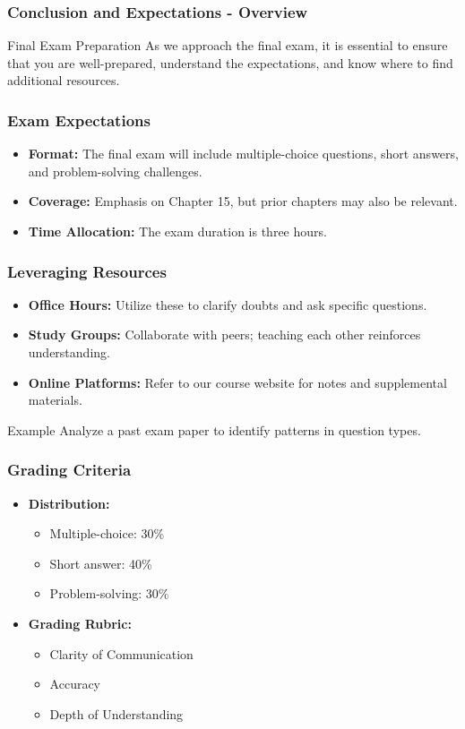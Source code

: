 \documentclass[aspectratio=169]{beamer}
\begin{document}
\begin{frame}[fragile]
    \frametitle{Conclusion and Expectations - Overview}
    \begin{block}{Final Exam Preparation}
        As we approach the final exam, it is essential to ensure that you are well-prepared, understand the expectations, and know where to find additional resources.
    \end{block}
\end{frame}

\begin{frame}[fragile]
    \frametitle{Exam Expectations}
    \begin{itemize}
        \item \textbf{Format:} The final exam will include multiple-choice questions, short answers, and problem-solving challenges.
        \item \textbf{Coverage:} Emphasis on Chapter 15, but prior chapters may also be relevant.
        \item \textbf{Time Allocation:} The exam duration is three hours.
    \end{itemize}
\end{frame}

\begin{frame}[fragile]
    \frametitle{Leveraging Resources}
    \begin{itemize}
        \item \textbf{Office Hours:} Utilize these to clarify doubts and ask specific questions.
        \item \textbf{Study Groups:} Collaborate with peers; teaching each other reinforces understanding.
        \item \textbf{Online Platforms:} Refer to our course website for notes and supplemental materials.
    \end{itemize}
    \begin{block}{Example}
        Analyze a past exam paper to identify patterns in question types.
    \end{block}
\end{frame}

\begin{frame}[fragile]
    \frametitle{Grading Criteria}
    \begin{itemize}
        \item \textbf{Distribution:}
        \begin{itemize}
            \item Multiple-choice: 30\%
            \item Short answer: 40\%
            \item Problem-solving: 30\%
        \end{itemize}
        \item \textbf{Grading Rubric:}
        \begin{itemize}
            \item Clarity of Communication
            \item Accuracy
            \item Depth of Understanding
        \end{itemize}
    \end{itemize}
\end{frame}
\end{document}
